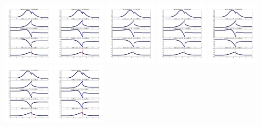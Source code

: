 \documentclass[11pt]{article}
\begin{document}
\vskip 10pt 
\includegraphics[width=0.19\textwidth]{frame0062fig1.png}
\vskip 10pt 
\includegraphics[width=0.19\textwidth]{frame0063fig1.png}
\vskip 10pt 
\includegraphics[width=0.19\textwidth]{frame0064fig1.png}
\vskip 10pt 
\includegraphics[width=0.19\textwidth]{frame0065fig1.png}
\vskip 10pt 
\includegraphics[width=0.19\textwidth]{frame0066fig1.png}
\vskip 10pt 
\includegraphics[width=0.19\textwidth]{frame0067fig1.png}
\vskip 10pt 
\includegraphics[width=0.19\textwidth]{frame0068fig1.png}
\end{document}
